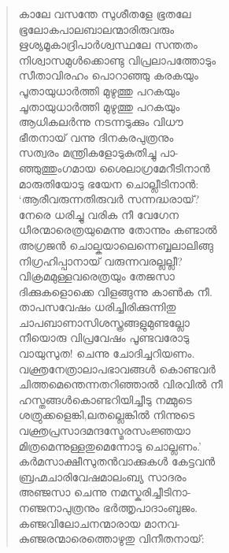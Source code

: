 \begin{verse}
കാലേ വസന്തേ സുശീതളേ ഭൂതലേ\\
ഭൂലോകപാലബാലന്മാരിരുവരും\\
ഋശ്യമൂകാദ്രിപാര്‍ശ്വസ്ഥലേ സന്തതം\\
നിശ്വാസമുള്‍ക്കൊണ്ടു വിപ്രലാപത്തോടും\\
സീതാവിരഹം പൊറാഞ്ഞു കരകയും\\
പൂതായുധാര്‍ത്തി മുഴുത്തു പറകയും\\
ചൂതായുധാര്‍ത്തി മുഴുത്തു പറകയും\\
ആധികലര്‍ന്നു നടന്നടുക്കും വിധൗ\\
ഭീതനായ് വന്നു ദിനകരപുത്രനും\\
സത്വരം മന്ത്രികളോടുകുതിച്ചു പാ-\\
ഞ്ഞുത്തുംഗമായ ശൈലാഗ്രമേറീടിനാന്‍\\
മാരുതിയോടു ഭയേന ചൊല്ലീടിനാന്‍:\\
‘ആരീവരുന്നതിരുവര്‍ സന്നദ്ധരായ്?\\
നേരെ ധരിച്ചു വരിക നീ വേഗേന\\
ധീരന്മാരെത്രയുമെന്നു തോന്നും കണ്ടാല്‍\\
അഗ്രജന്‍ ചൊല്കയാലെന്നെബ്ബലാലിങ്ങു\\
നിഗ്രഹിപ്പാനായ് വരുന്നവരല്ലല്ലീ?\\
വിക്രമമുള്ളവരെത്രയും തേജസാ\\
ദിക്കുകളൊക്കെ വിളങ്ങുന്നു കാണ്‍ക നീ.\\
താപസവേഷം ധരിച്ചിരിക്കുന്നിതു\\
ചാപബാണാസിശസ്ത്രങ്ങളുമുണ്ടല്ലോ\\
നീയൊരു വിപ്രവേഷം പൂണ്ടവരോടു\\
വായുസുത! ചെന്നു ചോദിച്ചറിയണം.\\
വക്ത്രനേത്രാലാപഭാവങ്ങള്‍ കൊണ്ടവര്‍\\
ചിത്തമെന്തെന്നതറിഞ്ഞാല്‍ വിരവില്‍ നീ\\
ഹസ്തങ്ങള്‍കൊണ്ടറിയിച്ചീടു നമ്മുടെ\\
ശത്രുക്കളെങ്കി,ലതല്ലെങ്കില്‍ നിന്നുടെ\\
വക്ത്രപ്രസാദമന്ദസ്മേരസംജ്ഞയാ\\
മിത്രമെന്നുള്ളതുമെന്നോടു ചൊല്ലണം.’\\
കര്‍മസാക്ഷീസുതന്‍വാക്കുകള്‍ കേട്ടവന്‍\\
ബ്രഹ്മചാരിവേഷമാലംബ്യ സാദരം\\
അഞ്ജസാ ചെന്നു നമസ്കരിച്ചീടിനാ-\\
നഞ്ജനാപുത്രനും ഭര്‍ത്തൃപാദാംബുജം.\\
കഞ്ജവിലോചനന്മാരായ മാനവ-\\
കുഞ്ജരന്മാരെത്തൊഴുതു വിനീതനായ്:\\

\end{verse}

